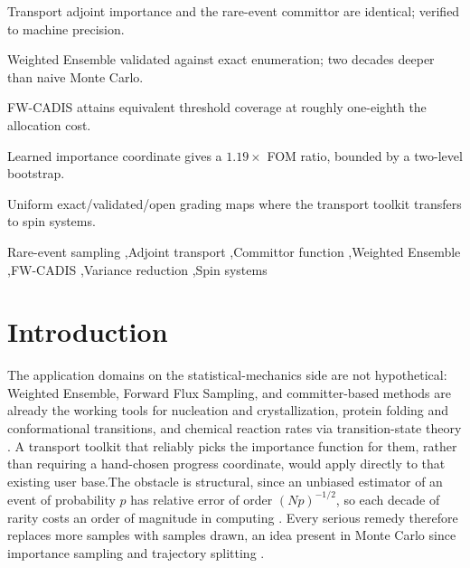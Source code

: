 \documentclass[a4paper,fleqn]{cas-sc}
\begin{document}
\begin{highlights}
\item Transport adjoint importance and the rare-event committor are identical; verified to machine precision.
\item Weighted Ensemble validated against exact enumeration; two decades deeper than naive Monte Carlo.
\item FW-CADIS attains equivalent threshold coverage at roughly one-eighth the allocation cost.
\item Learned importance coordinate gives a $1.19\times$ FOM ratio, bounded by a two-level bootstrap.
\item Uniform exact/validated/open grading maps where the transport toolkit transfers to spin systems.
\end{highlights}

\begin{keywords}
Rare-event sampling \sep Adjoint transport \sep Committor function \sep Weighted Ensemble \sep FW-CADIS \sep Variance reduction \sep Spin systems
\end{keywords}

\maketitle

\section{Introduction}\label{sec:intro}

The application domains on the statistical-mechanics side are not hypothetical: Weighted Ensemble, Forward Flux Sampling, and committer-based
methods are already the working tools for nucleation and crystallization, protein folding
and conformational transitions, and chemical reaction rates via transition-state theory
\cite{allen2009, zuckerman2017, e2006}. A transport toolkit that reliably picks the
importance function for them, rather than requiring a hand-chosen progress coordinate,
would apply directly to that existing user base.The obstacle is structural, since an unbiased estimator of an
event of probability $p$ has relative error of order $(Np)^{-1/2}$, so each decade of
rarity costs an order of magnitude in computing \cite{allen2009, touchette2009}. Every
serious remedy therefore replaces more samples with samples drawn, an idea present in Monte Carlo since importance sampling and trajectory splitting \cite{kahn1951, kahn1953}.
\end{document}
